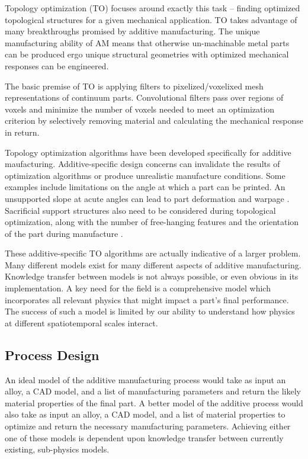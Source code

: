 Topology optimization (TO) focuses around exactly this task -- finding optimized topological structures for a given mechanical application. TO takes advantage of many breakthroughs promised by additive manufacturing. The unique manufacturing ability of AM means that otherwise un-machinable metal parts can be produced ergo unique structural geometries with optimized mechanical responses can be engineered. 

The basic premise of TO is applying filters to pixelized/voxelixed mesh representations of continuum parts. Convolutional filters pass over regions of voxels and minimize the number of voxels needed to meet an optimization criterion by selectively removing material and calculating the mechanical response in return. 


Topology optimization algorithms have been developed specifically for additive maufacturing. Additive-specific design concerns can invalidate the results of optimization algorithms or produce unrealistic manufacture conditions. Some examples include limitations on the angle at which a part can be printed. An unsupported slope at acute angles can lead to part deformation and warpage \cite{Gaynor2016}. Sacrificial support structures also need to be considered during topological optimization, along with the number of free-hanging features and the orientation of the part during manufacture \cite{Langelaar2016}. 

These additive-specific TO algorithms are actually indicative of a larger problem. Many different models exist for many different aspects of additive manufacturing. Knowledge transfer between models is not always possible, or even obvious in its implementation. A key need for the field is a comprehensive model which incorporates all relevant physics that might impact a part's final performance. The success of such a model is limited by our ability to understand how physics at different spatiotemporal scales interact.

\subsection{Process Design}
An ideal model of the additive manufacturing process would take as input an alloy, a CAD model, and a list of manufacturing parameters and return the likely material properties of the final part. A better model of the additive process would also take as input an alloy, a CAD model, and a list of material properties to optimize and return the necessary manufacturing parameters. Achieving either one of these models is dependent upon knowledge transfer between currently existing, sub-physics models. 

